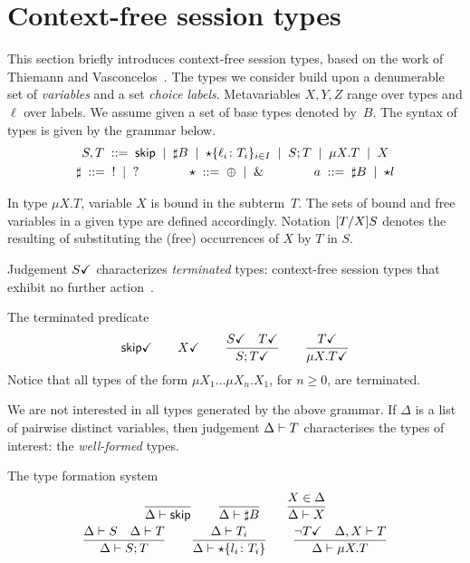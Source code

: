 \section{Context-free session types}
\label{sec:contextfreesession}

This section briefly introduces context-free session types, based on
the work of Thiemann and Vasconcelos~\cite{thiemann2016context}.
%
The types we consider build upon a denumerable set of \emph{variables}
and a set \emph{choice labels}.  Metavariables $X,Y,Z$ range over
types and $\ell$ over labels.
%
We assume given a set of base types denoted by~$B$.
The syntax of types is given by the grammar below.
%
\begin{gather*}
  S,T \grmeq \skipk \grmor \sharp B \grmor 
  \star\{\ell_i\colon T_i\}_{i\in I} \grmor S;T \grmor \mu X.T \grmor X
  \\
  \sharp \grmeq {}! \grmor {}? 
  \qquad \qquad
  \star  \grmeq \oplus \grmor {}\&
  \qquad \qquad
  a \grmeq \sharp B \grmor \star l %
\end{gather*}

In type $\mu X.T$, variable $X$ is bound in the subterm~$T$. The sets
of bound and free variables in a given type are defined
accordingly. Notation $\subs{T}{X}S$ denotes the resulting of
substituting the (free) occurrences of $X$ by $T$ in $S$.

Judgement $\DONE S$ characterizes \emph{terminated} types:
context-free session types that exhibit no further
action~\cite{DBLP:journals/jacm/AcetoH92}.

\noindent The terminated predicate\hfill{} 
%
\begin{gather*}
  \DONE{\skipk}
  \qquad 
  \DONE X
  \qquad
  \frac{\DONE{S} \quad \DONE{T}}{\DONE{S; T}}
  \qquad
  \frac{\DONE T}{\DONE{\mu X.T}}
\end{gather*}
%
Notice that all types of the form $\mu X_1\dots\mu X_n.X_1$, for
$n\ge0$, are terminated.

We are not interested in all types generated by the above grammar.
%
If $\Delta$ is a list of pairwise distinct variables, then judgement
$\isType T$ characterises the types of interest: the
\emph{well-formed} types.

\noindent The type formation system \hfill{}
%
\begin{gather*}
  \frac{} 
  {
    \isType \skipk
  }
  \qquad
  \frac{}
  {
    \isType {\sharp B}
  }
  \qquad
  \frac{
    X \in \Delta
  }{
    \isType{X}
  }
  \\
  \frac{
    \isType{S}
    \quad
    \isType{T}
  }{
    \isType{S;T}
  }
  \qquad
  \frac{
    \isType{T_i}
  }{
    \isType{\star 
      \{ l_i \colon T_i\}}
  }
  \qquad
  \frac{
    \neg\DONE T
    \quad 
    \isType [\Delta, X] T
  }{
    \isType {\mu X. T}
  }
\end{gather*}

